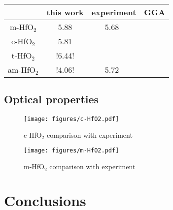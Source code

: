 \documentclass[10pt,a4paper,twocolumn]{article}
\begin{document}
\begin{table}
\begin{center}

\begin{tabular}{c|ccc}
			& this work & experiment & GGA \\
\hline
m-HfO$_2$ &	5.88 & 5.68~\cite{Balog1977} & \\
c-HfO$_2$ &	5.81 & & \\
t-HfO$_2$ &	!6.44! & & \\
am-HfO$_2$ & !4.06! & 5.72~\cite{Takeuchi2004} & \\

\end{tabular}

\end{center}
\end{table}

\subsection{Optical properties}

\begin{figure}
\begin{center}
	\texttt{[image: figures/c-HfO2.pdf]}
	\caption{c-HfO$_2$ comparison with experiment}
\end{center}
\end{figure}

\begin{figure}
\begin{center}
	\texttt{[image: figures/m-HfO2.pdf]}
	\caption{m-HfO$_2$ comparison with experiment}
\end{center}
\end{figure}


\section{Conclusions}



\end{document}
